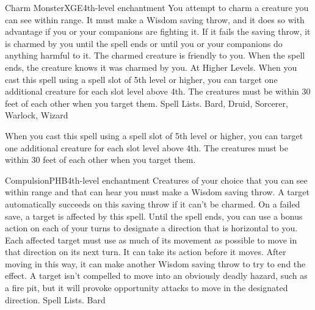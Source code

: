 \begin{spell}{Charm Monster}{XGE}{4th-level enchantment}
{
}
You attempt to charm a creature you can see within range. It must make a Wisdom saving throw, and it does so with advantage if you or your companions are fighting it. If it fails the saving throw, it is charmed by you until the spell ends or until you or your companions do anything harmful to it. The charmed creature is friendly to you. When the spell ends, the creature knows it was charmed by you.
At Higher Levels. When you cast this spell using a spell slot of 5th level or higher, you can target one additional creature for each slot level above 4th. The creatures must be within 30 feet of each other when you target them.
Spell Lists. Bard, Druid, Sorcerer, Warlock, Wizard

 When you cast this spell using a spell slot of 5th level or higher, you can target one additional creature for each slot level above 4th. The creatures must be within 30 feet of each other when you target them.
\end{spell}

\begin{spell}{Compulsion}{PHB}{4th-level enchantment}
{
}
Creatures of your choice that you can see within range and that can hear you must make a Wisdom saving throw. A target automatically succeeds on this saving throw if it can’t be charmed. On a failed save, a target is affected by this spell. Until the spell ends, you can use a bonus action on each of your turns to designate a direction that is horizontal to you. Each affected target must use as much of its movement as possible to move in that direction on its next turn. It can take its action before it moves. After moving in this way, it can make another Wisdom saving throw to try to end the effect.
A target isn’t compelled to move into an obviously deadly hazard, such as a fire pit, but it will provoke opportunity attacks to move in the designated direction.
Spell Lists. Bard
\end{spell}

